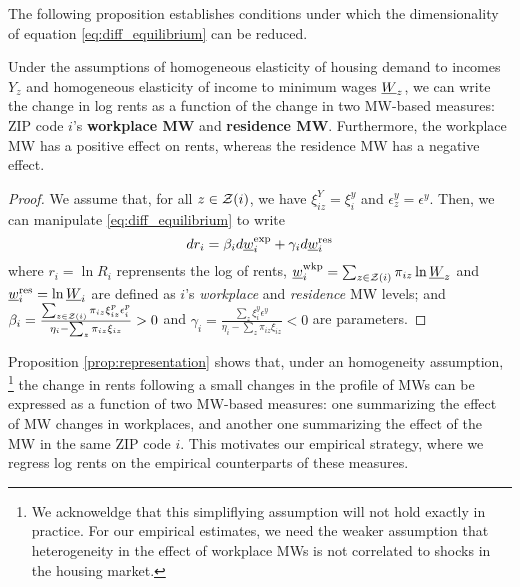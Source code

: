 The following proposition establishes conditions under which the dimensionality
of equation \ref{eq:diff_equilibrium} can be reduced.

\begin{prop}[Representation]\label{prop:representation}
    Under the assumptions of 
    homogeneous elasticity of housing demand to incomes $Y_z$ and
    homogeneous elasticity of income to minimum wages $\underline{W}_z$,
    we can write the change in log rents as a function of the change in two 
    MW-based measures: ZIP code $i$'s \textbf{workplace MW} and 
    \textbf{residence MW}.
    Furthermore, the workplace MW has a positive effect on rents, whereas the
    residence MW has a negative effect.
\end{prop}
\begin{proof}
    We assume that, for all $z\in\mathcal{Z}(i)$, we have 
    $\xi^Y_{iz}=\xi^y_{i}$ and 
    $\epsilon_z^y=\epsilon^y$.
    Then, we can manipulate \eqref{eq:diff_equilibrium} to write
    \begin{equation} \label{eq:theory_represenation}
        d r_i = \beta_i  d \underline{w}^{\text{exp}}_i
              + \gamma_i d \underline{w}^{\text{res}}_i
    \end{equation}
    where
    $r_i=\ln R_i$ reprensents the log of rents,
    $\underline{w}^{\text{wkp}}_i = \sum_{z\in\mathcal{Z}(i)} \pi_{iz} \ln \underline{W}_z$ and
    $\underline{w}^{\text{res}}_i = \ln \underline{W}_i$ are defined as $i$'s 
    \textit{workplace} and \textit{residence} MW levels; and
    $\beta_i = \frac{\sum_{z\in\mathcal{Z}(i)}\pi_{iz}\xi_{iz}^{p}\epsilon_{i}^{p}}
                    {\eta_{i} - \sum_z \pi_{iz} \xi_{iz}} 
             >0$ and
    $\gamma_i = \frac{\sum_z \xi_{i}^{y}\epsilon^{y}}
                     {\eta_{i} - \sum_z \pi_{iz} \xi_{iz}} 
              < 0$
    are parameters.
\end{proof}

Proposition \ref{prop:representation} shows that, under an homogeneity assumption,%
\footnote{We acknoweldge that this simpliflying assumption will not hold exactly
in practice.
For our empirical estimates, we need the weaker assumption that heterogeneity in 
the effect of workplace MWs is not correlated to shocks in the housing market.}
the change in rents following a small changes in the profile of MWs can be expressed 
as a function of two MW-based measures: 
one summarizing the effect of MW changes in workplaces,
and another one summarizing the effect of the MW in the same ZIP code $i$.
This motivates our empirical strategy, where we regress log rents on the empirical
counterparts of these measures.

